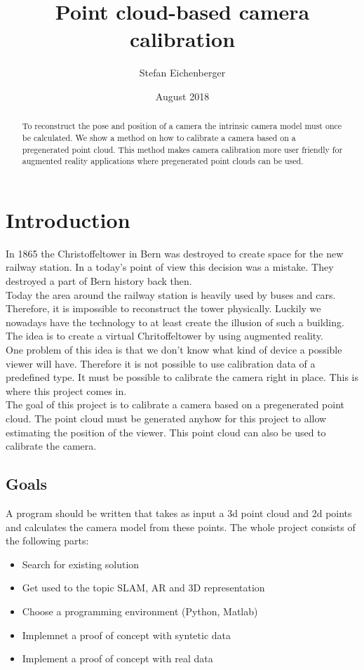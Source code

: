 \documentclass[11pt,a4paper,titlepage,oneside]{report}
\title{Point cloud-based camera calibration}
\author{Stefan Eichenberger}
\date{August 2018}
\begin{document}
\maketitle

\begin{abstract}
To reconstruct the pose and position of a camera the intrinsic camera model must once be calculated. We show a method on how to calibrate a camera based on a pregenerated point cloud. This method makes camera calibration more user friendly for augmented reality applications where pregenerated point clouds can be used.
\end{abstract}

\tableofcontents

\chapter{Introduction}
In 1865 the Christoffeltower in Bern was destroyed to create space for the new railway station. In a today's point of view this decision was a mistake. They destroyed a part of Bern history back then.\\
Today the area around the railway station is heavily used by buses and cars. Therefore, it is impossible to reconstruct the tower physically. Luckily we nowadays have the technology to at least create the illusion of such a building. The idea is to create a virtual Chritoffeltower by using augmented reality.\\
One problem of this idea is that we don't know what kind of device a possible viewer will have. Therefore it is not possible to use calibration data of a predefined type. It must be possible to calibrate the camera right in place. This is where this project comes in.\\
The goal of this project is to calibrate a camera based on a pregenerated point cloud. The point cloud must be generated anyhow for this project to allow estimating the position of the viewer. This point cloud can also be used to calibrate the camera. 

\section{Goals}
A program should be written that takes as input a 3d point cloud and 2d points and calculates the camera model from these points. The whole project consists of the following parts:
\begin{itemize}
\item Search for existing solution
\item Get used to the topic SLAM, AR and 3D representation
\item Choose a programming environment (Python, Matlab)
\item Implemnet a proof of concept with syntetic data
\item Implement a proof of concept with real data
\end{itemize}
\end{document}
